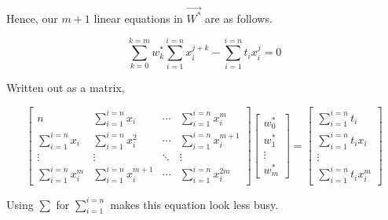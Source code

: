\documentclass{article}
\begin{document}
Hence, our \(m+1\) linear equations in \(\vec{W^*}\) are as follows.

\begin{equation}
    \sum_{k=0}^{k=m}{w_k^ * \sum_{i=1}^{i=n}{x_i^{j+k}} - \sum_{i=1}^{i=n}{t_i}x_i^j} = 0
\end{equation}

Written out as a matrix,

\begin{equation}
    \begin{bmatrix}
        n                       & \sum_{i=1}^{i=n}{x_i}       & \cdots & \sum_{i=1}^{i=n}{x_i^m}        \\[1em]
        \sum_{i=1}^{i=n}{x_i}   & \sum_{i=1}^{i=n}{x_i^2}     & \cdots & \sum_{i=1}^{i=n}{x_i^{m+1}}    \\[1em]
        \vdots                  & \vdots                      & \ddots & \vdots                         \\[1em]
        \sum_{i=1}^{i=n}{x_i^m} & \sum_{i=1}^{i=n}{x_i^{m+1}} & \cdots & \sum_{i=1}^{i=n}{x_i^{2m}}
    \end{bmatrix}\begin{bmatrix}
        w_0^*   \\[1em]
        w_1^*   \\[1em]
        \vdots  \\[1em]
        w_m^*
    \end{bmatrix} = \begin{bmatrix}
        \sum_{i=1}^{i=n}{t_i}       \\[1em]
        \sum_{i=1}^{i=n}{t_ix_i}    \\[1em]
        \vdots                      \\[1em]
        \sum_{i=1}^{i=n}{t_ix_i^m}
    \end{bmatrix}
\end{equation}

Using \(\sum{}\) for \(\sum_{i=1}^{i=n}{}\) makes this equation look less busy.
\end{document}
